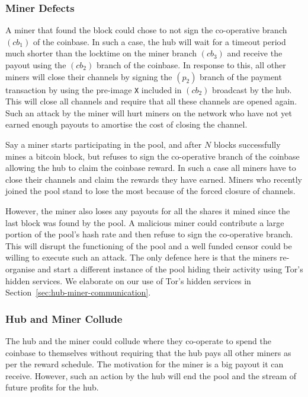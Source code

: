 \documentclass{article}
\begin{document}
\subsubsection{Miner Defects}\label{ref:miner-defects}

A miner that found the block could chose to not sign the co-operative
branch $(cb_1)$ of the coinbase. In such a case, the hub will wait for
a timeout period much shorter than the locktime on the miner branch
$(cb_3)$ and receive the payout using the $(cb_2)$ branch of the
coinbase. In response to this, all other miners will close their
channels by signing the $(p_2)$ branch of the payment transaction by
using the pre-image \verb|X| included in $(cb_2)$ broadcast by the
hub. This will close all channels and require that all these channels
are opened again. Such an attack by the miner will hurt miners on the
network who have not yet earned enough payouts to amortise the cost of
closing the channel.

Say a miner starts participating in the pool, and after $N$ blocks
successfully mines a bitcoin block, but refuses to sign the
co-operative branch of the coinbase allowing the hub to claim the
coinbase reward. In such a case all miners have to close their
channels and claim the rewards they have earned. Miners who recently
joined the pool stand to lose the most because of the forced closure
of channels.

However, the miner also loses any payouts for all the shares it mined
since the last block was found by the pool. A malicious miner could
contribute a large portion of the pool's hash rate and then refuse to
sign the co-operative branch. This will disrupt the functioning of the
pool and a well funded censor could be willing to execute such an
attack. The only defence here is that the miners re-organise and start
a different instance of the pool hiding their activity using Tor's
hidden services. We elaborate on our use of Tor's hidden services in
Section~\ref{sec:hub-miner-communication}.

\subsubsection{Hub and Miner Collude}\label{ref:collusion}

The hub and the miner could collude where they co-operate to spend the
coinbase to themselves without requiring that the hub pays all other
miners as per the reward schedule. The motivation for the miner is a
big payout it can receive. However, such an action by the hub will
end the pool and the stream of future profits for the hub.
\end{document}
